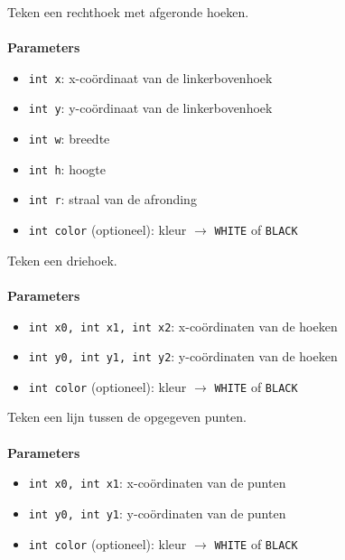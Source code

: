 \documentclass[11pt,fleqn]{book} %
\begin{document}
\begin{libf}[drawRoundRect(x, y, w, h, r, \emph{color=WHITE})]
	Teken een rechthoek met afgeronde hoeken.\\ \\
	\textbf{Parameters}
	\begin{itemize}
		\item \texttt{int x}: x-coördinaat van de linkerbovenhoek
		\item \texttt{int y}: y-coördinaat van de linkerbovenhoek
		\item \texttt{int w}: breedte
		\item \texttt{int h}: hoogte
		\item \texttt{int r}: straal van de afronding
		\item \texttt{int color} (optioneel): kleur $\rightarrow$ \texttt{WHITE} of \texttt{BLACK}
	\end{itemize}
\end{libf}

\begin{libf}[drawTriangle(x0, y0, x1, y1, x2, y2, \emph{color=WHITE})]
	Teken een driehoek.\\ \\
	\textbf{Parameters}
	\begin{itemize}
		\item \texttt{int x0, int x1, int x2}: x-coördinaten van de hoeken
		\item \texttt{int y0, int y1, int y2}: y-coördinaten van de hoeken
		\item \texttt{int color} (optioneel): kleur $\rightarrow$ \texttt{WHITE} of \texttt{BLACK}
	\end{itemize}
\end{libf}

\newpage

\begin{libf}[drawLine(x0, y0, x1, y1, \emph{color=WHITE})]
	Teken een lijn tussen de opgegeven punten.\\ \\
	\textbf{Parameters}
	\begin{itemize}
		\item \texttt{int x0, int x1}: x-coördinaten van de punten
		\item \texttt{int y0, int y1}: y-coördinaten van de punten
		\item \texttt{int color} (optioneel): kleur $\rightarrow$ \texttt{WHITE} of \texttt{BLACK}
	\end{itemize}
\end{libf}
\end{document}
